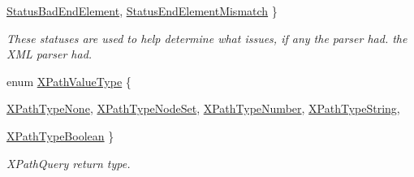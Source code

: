 \begin{DoxyCompactItemize}
\hyperlink{namespacephys_1_1xml_ae7aabb879b21c73d8183a54470f8917fa72532447020c081f343c4a719add7450}{StatusBadEndElement}, 
\hyperlink{namespacephys_1_1xml_ae7aabb879b21c73d8183a54470f8917fa6b8d817142e0898ad9b1c61cfa54b8ea}{StatusEndElementMismatch}
 \}
\begin{DoxyCompactList}\small\item\em These statuses are used to help determine what issues, if any the parser had. the XML parser had. \item\end{DoxyCompactList}\item 
enum \hyperlink{namespacephys_1_1xml_a339b9eef674ba44100110e5524bc575d}{XPathValueType} \{ \par
\hyperlink{namespacephys_1_1xml_a339b9eef674ba44100110e5524bc575dabf243ef424b79e9da4f5e52fca25bbe5}{XPathTypeNone}, 
\hyperlink{namespacephys_1_1xml_a339b9eef674ba44100110e5524bc575dacb1f770045b8cfe7634feb3c2745b0ba}{XPathTypeNodeSet}, 
\hyperlink{namespacephys_1_1xml_a339b9eef674ba44100110e5524bc575da5503130cd89cdb7f6c9f0cc72091a06c}{XPathTypeNumber}, 
\hyperlink{namespacephys_1_1xml_a339b9eef674ba44100110e5524bc575da1201c2db15249e26d46d828213e1e88b}{XPathTypeString}, 
\par
\hyperlink{namespacephys_1_1xml_a339b9eef674ba44100110e5524bc575da7d21654ec17f33027de173dd47aa9092}{XPathTypeBoolean}
 \}
\begin{DoxyCompactList}\small\item\em XPathQuery return type. \item\end{DoxyCompactList}\end{DoxyCompactItemize}
